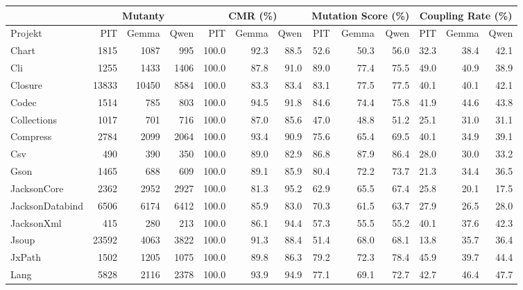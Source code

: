 \documentclass[12pt,a4paper,oldfontcommands]{memoir}
\theoremstyle{plain}
\theoremstyle{definition}
\theoremstyle{remark}
\begin{document}
    \begin{table}[H]
        \centering
        \scriptsize
        \begin{tabular}{|l|r|r|r|r|r|r|r|r|r||r|r|r|}
            \hline
            & \multicolumn{3}{c||}{Mutanty} & \multicolumn{3}{c||}{CMR (\%)} & \multicolumn{3}{c||}{Mutation Score (\%)} & \multicolumn{3}{c|}{Coupling Rate (\%)} \\ \hline
            Projekt & PIT & Gemma & Qwen & PIT & Gemma & Qwen & PIT & Gemma & Qwen & PIT & Gemma & Qwen \\ \hline
            Chart & 1815 & 1087 & 995 & 100.0 & 92.3 & 88.5 & 52.6 & 50.3 & 56.0 & 32.3 & 38.4 & 42.1 \\ \hline
            Cli & 1255 & 1433 & 1406 & 100.0 & 87.8 & 91.0 & 89.0 & 77.4 & 75.5 & 49.0 & 40.9 & 38.9 \\ \hline
            Closure & 13833 & 10450 & 8584 & 100.0 & 83.3 & 83.4 & 83.1 & 77.5 & 77.5 & 40.1 & 40.1 & 42.1 \\ \hline
            Codec & 1514 & 785 & 803 & 100.0 & 94.5 & 91.8 & 84.6 & 74.4 & 75.8 & 41.9 & 44.6 & 43.8 \\ \hline
            Collections & 1017 & 701 & 716 & 100.0 & 87.0 & 85.6 & 47.0 & 48.8 & 51.2 & 25.1 & 31.0 & 31.1 \\ \hline
            Compress & 2784 & 2099 & 2064 & 100.0 & 93.4 & 90.9 & 75.6 & 65.4 & 69.5 & 40.1 & 34.9 & 39.1 \\ \hline
            Csv & 490 & 390 & 350 & 100.0 & 89.0 & 82.9 & 86.8 & 87.9 & 86.4 & 28.0 & 30.0 & 33.2 \\ \hline
            Gson & 1465 & 688 & 609 & 100.0 & 89.1 & 85.9 & 80.4 & 72.2 & 73.7 & 21.3 & 34.4 & 36.5 \\ \hline
            JacksonCore & 2362 & 2952 & 2927 & 100.0 & 81.3 & 95.2 & 62.9 & 65.5 & 67.4 & 25.8 & 20.1 & 17.5 \\ \hline
            JacksonDatabind & 6506 & 6174 & 6412 & 100.0 & 85.9 & 83.0 & 70.3 & 61.5 & 63.7 & 27.9 & 26.5 & 28.0 \\ \hline
            JacksonXml & 415 & 280 & 213 & 100.0 & 86.1 & 94.4 & 57.3 & 55.5 & 55.2 & 40.1 & 37.6 & 42.3 \\ \hline
            Jsoup & 23592 & 4063 & 3822 & 100.0 & 91.3 & 88.4 & 51.4 & 68.0 & 68.1 & 13.8 & 35.7 & 36.4 \\ \hline
            JxPath & 1502 & 1205 & 1075 & 100.0 & 89.8 & 86.3 & 79.2 & 72.3 & 78.4 & 45.9 & 39.7 & 44.4 \\ \hline
            Lang & 5828 & 2116 & 2378 & 100.0 & 93.9 & 94.9 & 77.1 & 69.1 & 72.7 & 42.7 & 46.4 & 47.7 \\ \hline

\end{tabular}
\end{table}
\end{document}
